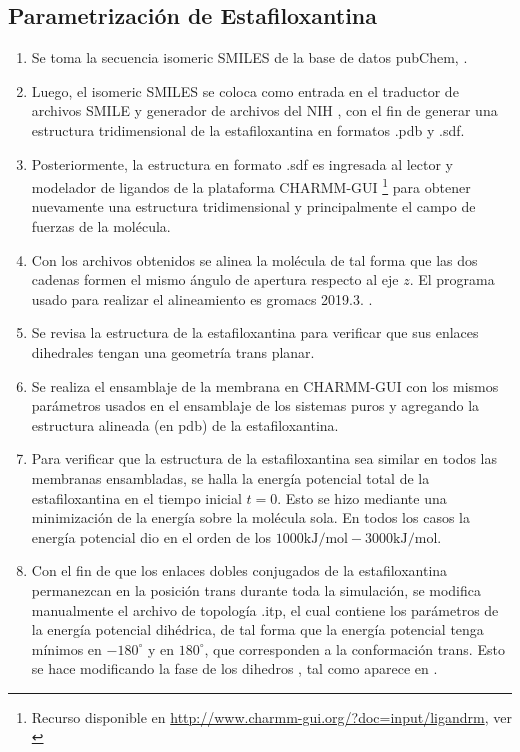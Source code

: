 \subsection*{Parametrizaci\'{o}n de Estafiloxantina}
\begin{enumerate}
    \item Se toma la secuencia isomeric SMILES de la base de datos pubChem, \cite{NationalCenterforBiotechnologyInformationStaphyloxanthinCID=56928085}.
    \item  Luego, el isomeric SMILES se coloca como entrada en el traductor de archivos SMILE y generador de archivos del NIH   \cite{OellienOnlineTranslator}, con el fin de generar una estructura tridimensional de la estafiloxantina  en formatos .pdb y .sdf.
    \item  Posteriormente, la estructura en formato .sdf es ingresada al lector y modelador de ligandos de la plataforma CHARMM-GUI  \footnote{Recurso disponible en \href{ http://www.charmm-gui.org/?doc=input/ligandrm}{ http://www.charmm-gui.org/?doc=input/ligandrm}, ver \cite{Brooks2009}} para obtener nuevamente una estructura tridimensional y principalmente el campo de fuerzas de la mol\'{e}cula.
    \item Con los archivos obtenidos se alinea la mol\'{e}cula de tal forma que las dos cadenas formen el mismo \'{a}ngulo de apertura respecto al eje $z$. El programa usado para realizar el alineamiento es gromacs 2019.3. \cite{GROMACSdevelopmentteam2019GROMACSDocumentation}.
    \item Se revisa la estructura de la estafiloxantina para verificar que sus enlaces dihedrales tengan una geometr\'{i}a trans planar.
    \item Se realiza el ensamblaje de la membrana en CHARMM-GUI con los mismos par\'{a}metros usados en el ensamblaje de los sistemas puros y agregando la estructura alineada (en pdb) de la estafiloxantina. 
    \item Para verificar que la estructura de la estafiloxantina sea similar en todos las membranas ensambladas, se halla la energ\'{i}a potencial total de la estafiloxantina en el tiempo inicial $t=0$. Esto se hizo mediante una minimizaci\'{o}n de la energ\'{i}a sobre la mol\'{e}cula sola. En todos los casos la energ\'{i}a potencial dio en el orden de los $1000\mathrm{kJ}/\mathrm{mol}-3000\mathrm{kJ}/\mathrm{mol}$.
    \item Con el fin de que los enlaces dobles conjugados de la estafiloxantina permanezcan en la posici\'{o}n trans durante toda la simulaci\'{o}n, se modifica manualmente el archivo de topolog\'{i}a .itp, el cual contiene los par\'{a}metros de la energ\'{i}a potencial dih\'{e}drica, de tal forma que la energ\'{i}a potencial tenga m\'{i}nimos en $-180^{\circ}$ y en $180^{\circ}$, que corresponden a la conformaci\'{o}n trans. Esto se hace modificando la fase de los dihedros , tal como aparece en \cite{Grudzinski2017LocalizationBilayer}.
\end{enumerate}
